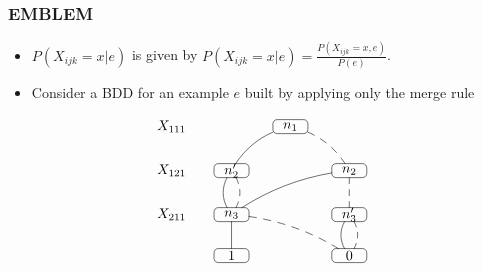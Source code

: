 \documentclass[trans,aspectratio=1610]{beamer}
\begin{document}
%
\begin{frame}
 \frametitle{EMBLEM}
 \begin{itemize}
\item 
$P(X_{ijk}=x|e)$ is given by $P(X_{ijk}=x|e)=\frac{P(X_{ijk}=x,e)}{P(e)}$.

\item Consider a BDD for an example $e$ built by applying only the merge rule
\end{itemize}
	{
	$$
\xymatrix@=6mm
{ X_{111} & &*=<25pt,10pt>[F-:<3pt>]{n_1}
\ar@/_/@{-}[ld] \ar@/^/@{--}[dr]\\ 
X_{121}  & *=<25pt,10pt>[F-:<3pt>]{n'_2}\ar@/_/@{-}[d]  \ar@/^/@{--}[d] &&*=<25pt,10pt>[F-:<3pt>]{n_2} 
\ar@/_/@{-}[dll]\ar@{--}[d] 
\\
X_{211}& *=<25pt,10pt>[F-:<3pt>]{n_3}
\ar@{-}[d] \ar@/^/@{--}[drr]  &&*=<25pt,10pt>[F-:<3pt>]{n'_3}
\ar@/_/@{-}[d] \ar@/^/@{--}[d]  \\
&*=<25pt,10pt>[F-:<3pt>]{1} &&*=<25pt,10pt>[F-:<3pt>]{0}}
$$
}	
\end{frame}
\end{document}
